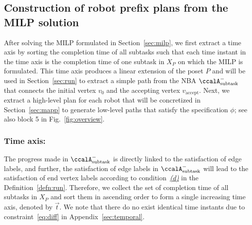 \documentclass[Afour,sageh,times]{sagej}
\newcommand{\auto}[1]{\ccalA_{\textup{#1}}}
\begin{document}
{{
\subsection{Construction of robot prefix plans from the MILP solution}\label{sec:path}
After solving the MILP formulated in Section~\ref{sec:milp}, we first extract a time axis by sorting the completion time of all subtasks such that each time instant in the time axis is the completion time of one subtask in $X_P$ on which the MILP is formulated. This time axis produces a linear extension of the poset $P$ and  will be used in Section~\ref{sec:run} to extract a simple path from the NBA $\auto{subtask}^-$ that connects the initial vertex $v_0$ and the accepting vertex $v_\text{accept}$. Next, we extract a high-level plan for each robot  that will be concretized in Section~\ref{sec:mapp} to generate low-level paths that satisfy the specification $\phi$; see also block 5 in Fig.~\ref{fig:overview}.


\subsubsection{Time axis:}\label{sec:timeaxis} The progress made in $\auto{subtask}^-$ is directly linked to the satisfaction of edge labels, and further, the satisfaction of edge labels in $\auto{subtask}^-$ will lead to the satisfaction of end vertex labels according to condition~\hyperref[cond:d]{\it (d)} in the Definition~\ref{defn:run}. Therefore, we collect the set of completion time of all subtasks in $X_P$ %
and  sort them in ascending order to form a single increasing time axis, denoted by $\vec{t}$. We note that there do no exist identical time instants due to constraint~\eqref{eq:diff} in Appendix~\ref{sec:temporal}.

}}
\end{document}
